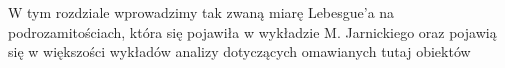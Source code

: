W tym rozdziale wprowadzimy tak zwaną miarę Lebesgue'a na podrozamitościach, która się pojawiła w wykładzie M. Jarnickiego \citep{Jarnicki}
oraz pojawią się w większości wykładów analizy dotyczących omawianych tutaj obiektów